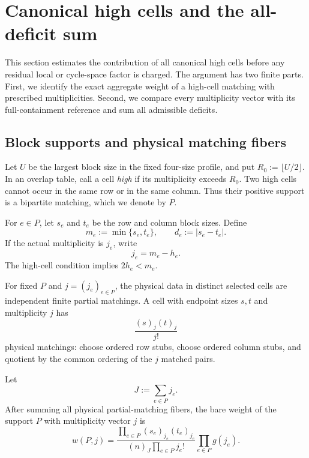
\section{Canonical high cells and the all-deficit sum}
\label{sec:canonical-high-cells-v2}

This section estimates the contribution of all canonical high cells before any
residual local or cycle-space factor is charged.  The argument has two finite
parts.  First, we identify the exact aggregate weight of a high-cell matching
with prescribed multiplicities.  Second, we compare every multiplicity vector
with its full-containment reference and sum all admissible deficits.

\subsection{Block supports and physical matching fibers}

Let $U$ be the largest block size in the fixed four-size profile, and put
$R_0:=\lfloor U/2\rfloor$.  In an overlap table, call a cell \emph{high} if its
multiplicity exceeds $R_0$.  Two high cells cannot occur in the same row or in
the same column.  Thus their positive support is a bipartite matching, which we
denote by $P$.

For $e\in P$, let $s_e$ and $t_e$ be the row and column block sizes.  Define
\[
  m_e:=\min\{s_e,t_e\},
  \qquad
  d_e:=|s_e-t_e|.
\]
If the actual multiplicity is $j_e$, write
\[
  j_e=m_e-h_e.
\]
The high-cell condition implies $2h_e<m_e$.

For fixed $P$ and $j=(j_e)_{e\in P}$, the physical data in distinct selected
cells are independent finite partial matchings.  A cell with endpoint sizes
$s,t$ and multiplicity $j$ has
\[
  \frac{(s)_j(t)_j}{j!}
\]
physical matchings: choose ordered row stubs, choose ordered column stubs, and
quotient by the common ordering of the $j$ matched pairs.

\begin{proposition}
\label{prop:aggregate-high-skeleton-weight-v2}
Let
\[
  J:=\sum_{e\in P}j_e.
\]
After summing all physical partial-matching fibers, the bare weight of the
support $P$ with multiplicity vector $j$ is
\begin{equation}
  w(P,j)
  =
  \frac{
    \displaystyle\prod_{e\in P}(s_e)_{j_e}(t_e)_{j_e}
  }{
    \displaystyle(n)_J\prod_{e\in P}j_e!
  }
  \prod_{e\in P}g(j_e).
  \label{eq:aggregate-high-skeleton-weight-v2}
\end{equation}
\end{proposition}

